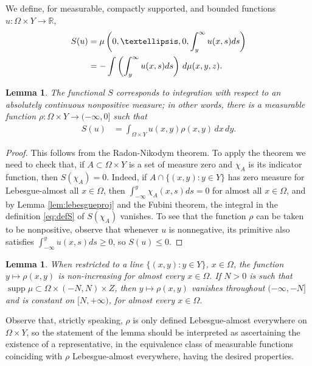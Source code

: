 \documentclass{article}
\newcommand{\R}{\mathbb{R}}
\newtheorem{lemma}[theorem]{Lemma}
\theoremstyle{definition}
\theoremstyle{remark}
\begin{document}
%
%
%
%
We define, for measurable, compactly supported, and bounded functions $u\colon\Omega\times Y\to\R$,
\begin{align}
\notag S(u)&=\mu\left(0,\dots,0,\int_{y}^\infty u(x,s)ds\right)\\
 \label{eq:defS} &=-\int \left(\int_{y}^\infty u(x,s)ds\right)\,d\mu(x,y,z).
\end{align}
\begin{lemma}\label{lem:radon-nikodym} 
 The functional $S$ corresponds to integration with respect to an absolutely continuous nonpositive measure; in other words, there is a measurable function $\rho\colon\Omega\times Y\to(-\infty,0]$ such that 
\begin{align*}
 S(u)&=\int_{\Omega\times Y} u(x,y)\rho(x,y)\,dx\,dy.
\end{align*}
\end{lemma}
\begin{proof}
 This follows from the Radon-Nikodym theorem. To apply the theorem we need to check that, if $A\subset \Omega\times Y$ is a set of measure zero and $\chi_A$ is its indicator function, then $S(\chi_A)=0$. 
 Indeed, if $A\cap \{(x,y):y\in Y\}$ has zero measure for Lebesgue-almost all $x\in\Omega$, then $\int_{-\infty}^y\chi_A(x,s)ds=0$ for almost all $x\in \Omega$, and by Lemma \ref{lem:lebesgueproj} and the Fubini theorem, the integral in the definition \eqref{eq:defS} of $S(\chi_A)$ vanishes. To see that the function $\rho$ can be taken to be nonpositive, observe that whenever $u$ is nonnegative, its primitive also satisfies $\int_{-\infty}^yu(x,s)ds\geq 0$, so $S(u)\leq 0$.
%
\end{proof}

\begin{lemma}\label{lem:decreasingconstant}
 When restricted to a line $\{(x,y):y\in Y\}$, $x\in \Omega$, the function $y\mapsto \rho(x,y)$ is non-increasing for almost every $x\in \Omega$. If $N>0$ is such that $\operatorname{supp}\mu\subset \Omega\times (-N,N)\times Z$, then $y\mapsto\rho(x,y)$ vanishes throughout $(-\infty,{-}N]$ and is constant on $[N,+\infty)$, for almost every $x\in\Omega$.
\end{lemma}

Observe that, strictly speaking, $\rho$ is only defined Lebesgue-almost everywhere on $\Omega\times Y$, so the statement of the lemma should be interpreted as ascertaining the existence of a representative, in the 
equivalence class of measurable functions coinciding with $\rho$ Lebesgue-almost everywhere, having the desired properties.
\end{document}
